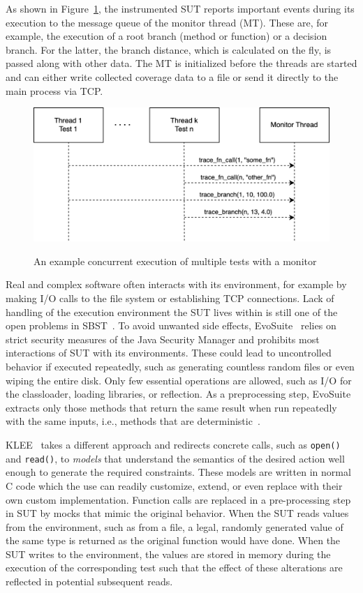 \documentclass{article}
\begin{document}
As shown in Figure~\ref{fig:test-execution}, the instrumented \ac{SUT} reports important events during its execution to the message queue of the monitor thread (MT). These are, for example, the execution of a root branch (method or function) or a decision branch. For the latter, the branch distance, which is calculated on the fly, is passed along with other data. The MT is initialized before the threads are started and can either write collected coverage data to a file or send it directly to the main process via TCP.

\begin{figure}[h]
\caption{An example concurrent execution of multiple tests with a monitor}
\centering
\includegraphics[width=\textwidth]{test-execution}
\label{fig:test-execution}
\end{figure}

Real and complex software often interacts with its environment, for example by making I/O calls to the file system or establishing TCP connections. Lack of handling of the execution environment the \ac{SUT} lives within is still one of the open problems in \ac{SBST}~\cite{McMinn2011}. To avoid unwanted side effects, EvoSuite~\cite{Fraser2013a} relies on strict security measures of the Java Security Manager and prohibits most interactions of \ac{SUT} with its environments. These could lead to uncontrolled behavior if executed repeatedly, such as generating countless random files or even wiping the entire disk. Only few essential operations are allowed, such as I/O for the classloader, loading libraries, or reflection. As a preprocessing step, EvoSuite extracts only those methods that return the same result when run repeatedly with the same inputs, i.e., methods that are deterministic~\cite{Fraser2012}.

KLEE~\cite{cadar2008klee} takes a different approach and redirects concrete calls, such as \lstinline{open()} and \lstinline{read()}, to \textit{models} that understand the semantics of the desired action well enough to generate the required constraints. These models are written in normal C code which the use can readily customize, extend, or even replace with their own custom implementation. Function calls are replaced in a pre-processing step in \ac{SUT} by mocks that mimic the original behavior. When the \ac{SUT} reads values from the environment, such as from a file, a legal, randomly generated value of the same type is returned as the original function would have done. When the \ac{SUT} writes to the environment, the values are stored in memory during the execution of the corresponding test such that the effect of these alterations are reflected in potential subsequent reads. 
\end{document}
